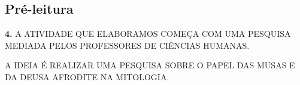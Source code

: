 \documentclass{extarticle}
\begin{document}






\subsection{Pré-leitura}

\textbf{4.} A ATIVIDADE QUE ELABORAMOS COMEÇA COM UMA PESQUISA MEDIADA
PELOS PROFESSORES DE CIÊNCIAS HUMANAS.
 
A IDEIA É REALIZAR UMA PESQUISA SOBRE O PAPEL DAS MUSAS E DA DEUSA
AFRODITE NA MITOLOGIA.
 
\end{document}
